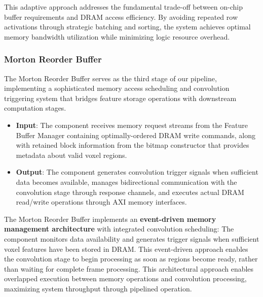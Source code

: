 \documentclass[sigconf, screen]{acmart}
\begin{document}
This adaptive approach addresses the fundamental trade-off between on-chip buffer requirements and DRAM access efficiency. By avoiding repeated row activations through strategic batching and sorting, the system achieves optimal memory bandwidth utilization while minimizing logic resource overhead. 

\subsubsection{Morton Reorder Buffer}
The Morton Reorder Buffer serves as the third stage of our pipeline, implementing a sophisticated memory access scheduling and convolution triggering system that bridges feature storage operations with downstream computation stages.
\begin{itemize}
    \item \textbf{Input}: The component receives memory request streams from the Feature Buffer Manager containing optimally-ordered DRAM write commands, along with retained block information from the bitmap constructor that provides metadata about valid voxel regions.
    \item \textbf{Output}: The component generates convolution trigger signals when sufficient data becomes available, manages bidirectional communication with the convolution stage through response channels, and executes actual DRAM read/write operations through AXI memory interfaces.
\end{itemize}
The Morton Reorder Buffer implements an \textbf{event-driven memory management architecture} with integrated convolution scheduling: The component monitors data availability and generates trigger signals when sufficient voxel features have been stored in DRAM. This event-driven approach enables the convolution stage to begin processing as soon as regions become ready, rather than waiting for complete frame processing.
This architectural approach enables overlapped execution between memory operations and convolution processing, maximizing system throughput through pipelined operation.
\end{document}
